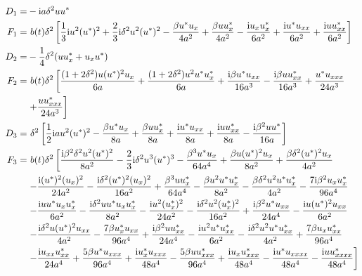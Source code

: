 \documentclass[12pt]{article}
\begin{document}
\begin{align}
  D_{1} =& -\mathrm{i}a\delta^{2} uu^{*} \\
  F_{1} =&\ b(t)\delta^{2} \left[\frac{1}{3}\mathrm{i}u^{2}(u^{*})^{2} + \frac{2}{3}\mathrm{i}\delta^{2}u^{2}(u^{*})^{2} - \frac{\beta u^{*}u_{x}}{4a^{2}} + \frac{\beta uu^{*}_{x}}{4a^{2}} - \frac{\mathrm{i}u_{x}u^{*}_{x}}{6a^{2}} + \frac{\mathrm{i}u^{*}u_{xx}}{6a^{2}} + \frac{\mathrm{i}uu^{*}_{xx}}{6a^{2}} \right] \\
  D_{2} =& -\frac{1}{4}\delta^{2} (uu^{*}_{x} + u_{x}u^{*}) \\
  F_{2} =&\ b(t)\delta^{2} \left[\frac{(1+2\delta^{2})u(u^{*})^{2}u_{x}}{6a} + \frac{(1+2\delta^{2})u^{2}u^{*}u^{*}_{x}}{6a} + \frac{\mathrm{i}\beta u^{*}u_{xx}}{16a^{3}} - \frac{\mathrm{i}\beta uu^{*}_{xx}}{16a^{3}} + \frac{u^{*}u_{xxx}}{24a^{3}} \right. \notag \\
  & \left. + \frac{uu^{*}_{xxx}}{24a^{3}} \right] \\
  D_{3} =&\ \delta^{2}\left[\frac{1}{2}\mathrm{i}au^{2}(u^{*})^{2} - \frac{\beta u^{*}u_{x}}{8a} + \frac{\beta uu^{*}_{x}}{8a} + \frac{\mathrm{i}u^{*}u_{xx}}{8a} + \frac{\mathrm{i}uu^{*}_{xx}}{8a} - \frac{\mathrm{i}\beta^{2}uu^{*}}{16a}\right] \\
  F_{3} =&\ b(t)\delta^{2} \left[\frac{\mathrm{i}\beta^{2}\delta^{2}u^{2}(u^{*})^{2}}{8a^{2}} - \frac{2}{3}\mathrm{i}\delta^{2}u^{3}(u^{*})^{3} - \frac{\beta^{3}u^{*}u_{x}}{64a^{4}} + \frac{\beta u(u^{*})^{2}u_{x}}{8a^{2}} + \frac{\beta\delta^{2}(u^{*})^{2}u_{x}}{4a^{2}}  \right. \notag \\
  & \left. - \frac{\mathrm{i}(u^{*})^{2}(u_{x})^{2}}{24a^{2}} - \frac{\mathrm{i}\delta^{2}(u^{*})^{2}(u_{x})^{2}}{16a^{2}} + \frac{\beta^{3}uu^{*}_{x}}{64a^{4}} - \frac{\beta u^{2}u^{*}u^{*}_{x}}{8a^{2}} - \frac{\beta\delta^{2}u^{2}u^{*}u^{*}_{x}}{4a^{2}} - \frac{7\mathrm{i}\beta^{2}u_{x}u^{*}_{x}}{96a^{4}} \right. \notag \\
  & \left. - \frac{\mathrm{i}uu^{*}u_{x}u^{*}_{x}}{6a^{2}} - \frac{\mathrm{i}\delta^{2}uu^{*}u_{x}u^{*}_{x}}{8a^{2}} - \frac{\mathrm{i}u^{2}(u^{*}_{x})^{2}}{24a^{2}} - \frac{\mathrm{i}\delta^{2}u^{2}(u^{*}_{x})^{2}}{16a^{2}} + \frac{\mathrm{i}\beta^{2}u^{*}u_{xx}}{24a^{4}} - \frac{\mathrm{i}u(u^{*})^{2}u_{xx}}{6a^{2}} \right. \notag \\
  & \left. - \frac{\mathrm{i}\delta^{2}u(u^{*})^{2}u_{xx}}{4a^{2}} - \frac{7\beta u^{*}_{x}u_{xx}}{96a^{4}} + \frac{\mathrm{i}\beta^{2}uu^{*}_{xx}}{24a^{4}} -\frac{\mathrm{i}u^{2}u^{*}u^{*}_{xx}}{6a^{2}} - \frac{\mathrm{i}\delta^{2}u^{2}u^{*}u^{*}_{xx}}{4a^{2}} + \frac{7\beta u_{x}u^{*}_{xx}}{96a^{4}} \right. \notag \\
  & \left.  - \frac{\mathrm{i}u_{xx}u^{*}_{xx}}{24a^{4}} + \frac{5\beta u^{*}u_{xxx}}{96a^{4}} + \frac{\mathrm{i}u^{*}_{x}u_{xxx}}{48a^{4}} - \frac{5\beta uu^{*}_{xxx}}{96a^{4}} + \frac{\mathrm{i}u_{x}u^{*}_{xxx}}{48a^{4}} - \frac{\mathrm{i}u^{*}u_{xxxx}}{48a^{4}} - \frac{\mathrm{i}uu^{*}_{xxxx}}{48a^{4}} \right]
\end{align}
\end{document}
